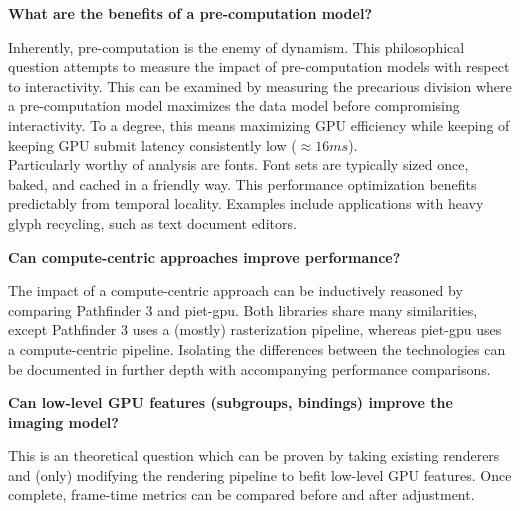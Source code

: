 \textbf{What are the benefits of a pre-computation model?}\\
\begin{adjustwidth}{2cm}{}
Inherently, pre-computation is the enemy of dynamism. This philosophical question attempts to measure the impact of pre-computation models with respect to interactivity. This can be examined by measuring the precarious division where a pre-computation model maximizes the data model before compromising interactivity. To a degree, this means maximizing GPU efficiency while keeping of keeping GPU submit latency consistently low ($\approx16ms$).\\

Particularly worthy of analysis are fonts. Font sets are typically sized once, baked, and cached in a friendly way. This performance optimization benefits predictably from temporal locality. Examples include applications with heavy glyph recycling, such as text document editors.\\
\end{adjustwidth}

\textbf{Can compute-centric approaches improve performance?}\\
\begin{adjustwidth}{2cm}{}
The impact of a compute-centric approach can be inductively reasoned by comparing Pathfinder 3 and piet-gpu. Both libraries share many similarities, except Pathfinder 3 uses a (mostly) rasterization pipeline, whereas piet-gpu uses a compute-centric pipeline. Isolating the differences between the technologies can be documented in further depth with accompanying performance comparisons.\\
\end{adjustwidth}

\textbf{Can low-level GPU features (subgroups, bindings) improve the imaging model?}\\
\begin{adjustwidth}{2cm}{}
This is an theoretical question which can be proven by taking existing renderers and (only) modifying the rendering pipeline to befit low-level GPU features. Once complete, frame-time metrics can be compared before and after adjustment.
\end{adjustwidth}

